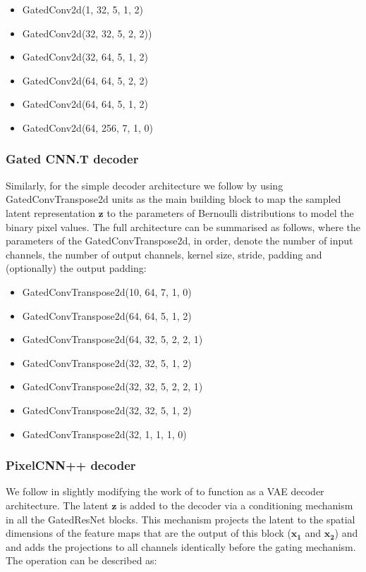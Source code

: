 \begin{itemize}
    \item GatedConv2d(1,  32,  5, 1, 2)
    \item GatedConv2d(32, 32,  5, 2, 2))
    \item GatedConv2d(32, 64,  5, 1, 2)
    \item GatedConv2d(64, 64,  5, 2, 2)
    \item GatedConv2d(64, 64,  5, 1, 2)
    \item GatedConv2d(64, 256, 7, 1, 0)
\end{itemize}

\subsubsection{Gated CNN.T decoder}

Similarly, for the simple decoder architecture we follow \citet{van2018sylvester} by using GatedConvTranspose2d units as the main building block to map the sampled latent representation $\mathbf{z}$ to the parameters of Bernoulli distributions to model the binary pixel values. The full architecture can be summarised as follows, where the parameters of the GatedConvTranspose2d, in order, denote the number of input channels, the number of output channels, kernel size, stride, padding and (optionally) the output padding:

\begin{itemize}
    \item GatedConvTranspose2d(10, 64, 7, 1, 0)
    \item GatedConvTranspose2d(64, 64, 5, 1, 2)
    \item GatedConvTranspose2d(64, 32, 5, 2, 2, 1)
    \item GatedConvTranspose2d(32, 32, 5, 1, 2)
    \item GatedConvTranspose2d(32, 32, 5, 2, 2, 1)
    \item GatedConvTranspose2d(32, 32, 5, 1, 2)
    \item GatedConvTranspose2d(32, 1, 1, 1, 0)
\end{itemize}

\subsubsection{PixelCNN++ decoder}

We follow \cite{alemi2018fixing} in slightly modifying the work of \cite{salimans2017pixelcnn++} to function as a VAE decoder architecture. The latent $\mathbf{z}$ is added to the decoder via a conditioning mechanism in all the GatedResNet blocks. This mechanism projects the latent to the spatial dimensions of the feature maps that are the output of this block ($\mathbf{x_1}$ and $\mathbf{x_2}$) and and adds the projections to all channels identically before the gating mechanism. The operation can be described as:

